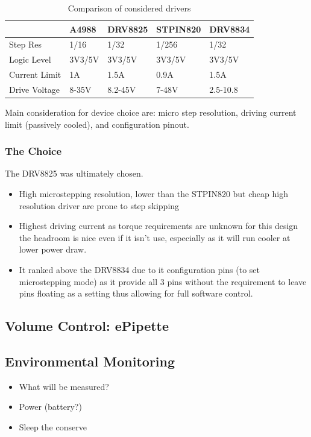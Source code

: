 \begin{table}[h]
    \centering
    \begin{tabular}{|l|l|l|l|l|}
        \hline
        \textbf{}     & \textbf{A4988} & \textbf{DRV8825} & \textbf{STPIN820} & \textbf{DRV8834} \\ \hline
        Step Res      & 1/16           & 1/32             & 1/256             & 1/32             \\ \hline
        Logic Level   & 3V3/5V         & 3V3/5V           & 3V3/5V            & 3V3/5V           \\ \hline
        Current Limit & 1A             & 1.5A             & 0.9A              & 1.5A             \\ \hline
        Drive Voltage & 8-35V          & 8.2-45V          & 7-48V             & 2.5-10.8         \\ \hline
    \end{tabular}
    \caption{Comparison of considered drivers}
\end{table}

Main consideration for device choice are: micro step resolution, driving current limit (passively cooled), and configuration pinout.

\subsubsection*{The Choice}
The DRV8825 was ultimately chosen.
\begin{itemize}
    \item High microstepping resolution, lower than the STPIN820 but cheap high resolution driver are prone to step skipping \cite{step_book}
    \item Highest driving current as torque requirements are unknown for this design the headroom is nice even if it isn't use, especially as it will run cooler at lower power draw.
    \item It ranked above the DRV8834 due to it configuration pins (to set microstepping mode) as it provide all 3 pins without the requirement to leave pins floating as a setting thus allowing for full software control.
\end{itemize}

\subsection{Volume Control: ePipette}

\subsection{Environmental Monitoring}
\begin{itemize}
    \item What will be measured?
    \item Power (battery?)
    \item Sleep the conserve
\end{itemize}
